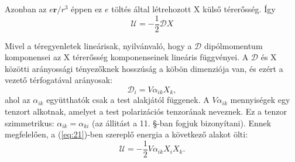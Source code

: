 \documentclass{article}
\begin{document}
Azonban az $e\textbf{r}/r^3$ éppen ez $e$ töltés által létrehozott X külső térerősség. Így
\begin{equation} \label{eq:22}
    \mathcal{U} = -\frac{1}{2} \mathcal{D}X
\end{equation}

Mivel a téregyenletek lineárisak, nyilvánvaló, hogy a $\mathcal{D}$ dipólmomentum komponensei az X térerősség komponenseinek lineáris függvényei. A $\mathcal{D}$ és X közötti arányossági tényezőknek hosszúság a köbön dimenziója van, és ezért a vezető térfogatával arányosak:
\begin{equation} \label{eq:23}
    \mathcal{D}_i = V \alpha_{ik} X_k ,
\end{equation}
ahol az $\alpha_{ik}$ együtthatók csak a test alakjától függenek. A $V \alpha_{ik}$ mennyiségek egy tenzort alkotnak, amelyet a test polarizációs tenzorának neveznek. Ez a tenzor szimmetrikus: $\alpha_{ik} = \alpha_{ki}$ (az állitást a 11. §-ban fogjuk bizonyítani). Ennek megfelelően, a (\ref{eq:21})-ben szereplő energia a következő alakot ölti:
\begin{equation} \label{eq:24}
    \mathcal{U} = -\frac{1}{2} V \alpha_{ik} X_i X_k .
\end{equation}
\end{document}
